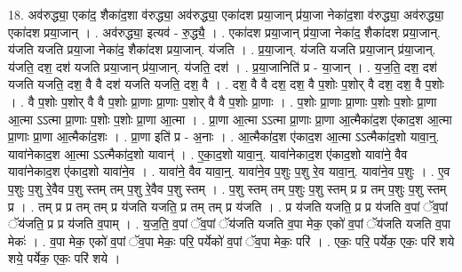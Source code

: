 \documentclass[17pt]{extarticle}
\begin{document}
18. अव॑रुद्ध्या॒ एका॑द॒ शैका॑द॒शा व॑रुद्ध्या॒ अव॑रुद्ध्या॒ एका॑दश प्रया॒जान् प्र॑या॒जा नेका॑द॒शा व॑रुद्ध्या॒ अव॑रुद्ध्या॒ एका॑दश प्रया॒जान् । . अव॑रुद्ध्या॒ इत्यव॑ - रु॒द्ध्यै॒ । . एका॑दश प्रया॒जान् प्र॑या॒जा नेका॑द॒ शैका॑दश प्रया॒जान्. य॑जति यजति प्रया॒जा नेका॑द॒ शैका॑दश प्रया॒जान्. य॑जति । . प्र॒या॒जान्. य॑जति यजति प्रया॒जान् प्र॑या॒जान्. य॑जति॒ दश॒ दश॑ यजति प्रया॒जान् प्र॑या॒जान्. य॑जति॒ दश॑ । . प्र॒या॒जानिति॑ प्र - या॒जान् । . य॒ज॒ति॒ दश॒ दश॑ यजति यजति॒ दश॒ वै वै दश॑ यजति यजति॒ दश॒ वै । . दश॒ वै वै दश॒ दश॒ वै प॒शोः प॒शोर् वै दश॒ दश॒ वै प॒शोः । . वै प॒शोः प॒शोर् वै वै प॒शोः प्रा॒णाः प्रा॒णाः प॒शोर् वै वै प॒शोः प्रा॒णाः । . प॒शोः प्रा॒णाः प्रा॒णाः प॒शोः प॒शोः प्रा॒णा आ॒त्मा ऽऽत्मा प्रा॒णाः प॒शोः प॒शोः प्रा॒णा आ॒त्मा । . प्रा॒णा आ॒त्मा ऽऽत्मा प्रा॒णाः प्रा॒णा आ॒त्मैका॑द॒श ए॑काद॒श आ॒त्मा प्रा॒णाः प्रा॒णा आ॒त्मैका॑द॒शः । . प्रा॒णा इति॑ प्र - अ॒नाः । . आ॒त्मैका॑द॒श ए॑काद॒श आ॒त्मा ऽऽत्मैका॑द॒शो यावा॒न्॒. यावा॑नेकाद॒श आ॒त्मा ऽऽत्मैका॑द॒शो यावान्॑ । . ए॒का॒द॒शो यावा॒न्॒. यावा॑नेकाद॒श ए॑काद॒शो यावा॑ने॒ वैव यावा॑नेकाद॒श ए॑काद॒शो यावा॑ने॒व । . यावा॑ने॒ वैव यावा॒न्॒. यावा॑ने॒व प॒शुः प॒शु रे॒व यावा॒न्॒. यावा॑ने॒व प॒शुः । . ए॒व प॒शुः प॒शु रे॒वैव प॒शु स्तम् तम् प॒शु रे॒वैव प॒शु स्तम् । . प॒शु स्तम् तम् प॒शुः प॒शु स्तम् प्र प्र तम् प॒शुः प॒शु स्तम् प्र । . तम् प्र प्र तम् तम् प्र य॑जति यजति॒ प्र तम् तम् प्र य॑जति । . प्र य॑जति यजति॒ प्र प्र य॑जति व॒पां ॅव॒पां ॅय॑जति॒ प्र प्र य॑जति व॒पाम् । . य॒ज॒ति॒ व॒पां ॅव॒पां ॅय॑जति यजति व॒पा मेक॒ एको॑ व॒पां ॅय॑जति यजति व॒पा मेकः॑ । . व॒पा मेक॒ एको॑ व॒पां ॅव॒पा मेकः॒ परि॒ पर्येको॑ व॒पां ॅव॒पा मेकः॒ परि॑ । . एकः॒ परि॒ पर्येक॒ एकः॒ परि॑ शये शये॒ पर्येक॒ एकः॒ परि॑ शये । \newline
\end{document}
